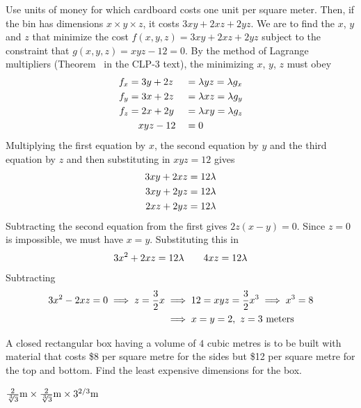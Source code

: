 \begin{solution}
Use units of money for which cardboard costs one unit per
square meter. Then, if the bin has dimensions $x\times y\times z$, it costs
$3xy+2xz+2yz$. We are to find the $x$, $y$ and $z$ that minimize the cost $f(x,y,z)=3xy+2xz+2yz$ subject to the constraint that $g(x,y,z)=xyz-12=0$. 
By the method of Lagrange multipliers (Theorem~ 
in the CLP-3 text), the minimizing $x$, $y$, $z$ must obey
\begin{alignat*}{3}
f_x&=3y+2z&&=\lambda yz=\lambda g_x \\
f_y&=3x+2z&&=\lambda xz=\lambda g_y \\
f_z&=2x+2y&&=\lambda xy=\lambda g_z \\
&\ \ \ xyz-12&&=0
\end{alignat*}
Multiplying the first equation by $x$, the second equation by $y$ 
and the third equation by $z$ and then substituting in $xyz=12$ gives
\begin{align*}
3xy+2xz&=12\lambda \\
3xy+2yz&=12\lambda \\
2xz+2yz&=12\lambda 
\end{align*}
Subtracting the second equation from the first gives $2z(x-y)=0$.
Since $z=0$ is impossible, we must have $x=y$. Substituting this in
\begin{equation*}
3x^2+2xz=12\lambda\qquad 4xz=12\lambda
\end{equation*}
Subtracting
\begin{align*}
3x^2-2xz=0\implies z=\frac{3}{2}x
&\implies 12=xyz=\frac{3}{2}x^3
\implies x^3=8 \\
&\implies x=y=2,\ z=3\ {\rm meters}
\end{align*}
\end{solution}

\begin{question}[M200 2000D] %
A closed rectangular box having a volume of $4$ cubic metres
is to be built with material that costs \$8 per square metre for the sides
but \$12 per square metre for the top and bottom. Find the least expensive
dimensions for the box.
\end{question}

%

\begin{answer}
$\frac{2}{\root 3\of 3}{\rm m}\times\frac{2}{\root 3\of 3}{\rm m}
                                \times 3^{2/3}{\rm m}$
\end{answer}

